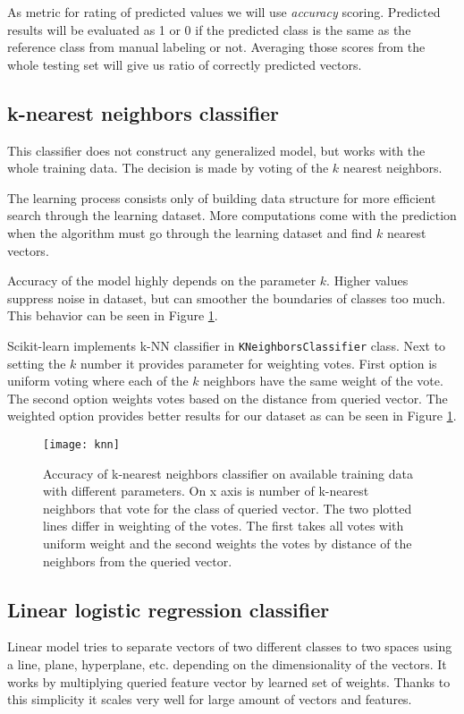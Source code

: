 As metric for rating of predicted values we will use \emph{accuracy} scoring.
Predicted results will be evaluated as 1 or 0 if the predicted class is the same as the reference
class from manual labeling or not. Averaging those scores from the whole testing
set will give us ratio of correctly predicted vectors.

\subsection{k-nearest neighbors classifier}
This classifier does not construct any generalized model, but works with the
whole training data. The decision is made by voting of the $k$ nearest
neighbors.

The learning process consists only of building data structure for more efficient
search through the learning dataset. More computations come with the prediction
when the algorithm must go through the learning dataset and find $k$ nearest
vectors.

Accuracy of the model highly depends on the parameter $k$. Higher values
suppress noise in dataset, but can smoother the boundaries of classes too much.
This behavior can be seen in Figure \ref{fig:knn}.

Scikit-learn implements k-NN classifier in \texttt{K\-Neighbors\-Classifier} class.
Next to setting the $k$ number it provides parameter for weighting votes. First
option is uniform voting where each of the $k$ neighbors have the same weight of
the vote. The second option weights votes based on the distance from queried
vector. The weighted option provides better results for our dataset as can be
seen in Figure \ref{fig:knn}.

\begin{figure}
  \centering
  \texttt{[image: knn]}
  \caption{Accuracy of k-nearest neighbors classifier on available training
    data with different parameters. On x axis is number of k-nearest neighbors
    that vote for the class of queried vector. The two plotted lines differ in
    weighting of the votes. The first takes all votes with uniform weight and
    the second weights the votes by distance of the neighbors from the queried
    vector.}
  \label{fig:knn}
\end{figure}

\subsection{Linear logistic regression classifier}
Linear model tries to separate vectors of two different classes to two spaces
using a line, plane, hyperplane, etc. depending on the dimensionality of the
vectors. It works by multiplying queried feature vector by learned set of
weights. Thanks to this simplicity it scales very well for large amount of
vectors and features.

